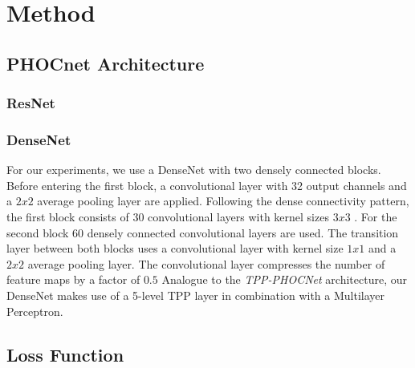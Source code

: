 \section{Method}\label{sec:method}


\subsection{PHOCnet Architecture}\label{sec:text_det}

 
\subsubsection{ResNet}\label{sec:text_det_sift}


\subsubsection{DenseNet}\label{sec:DenseNet}
For our experiments, we use a DenseNet with two densely connected blocks.
Before entering the first block, a convolutional layer with 32 output channels and a $2x2$ average pooling layer are applied.
Following the dense connectivity pattern, the first block consists of 30 convolutional layers with kernel sizes $3x3$ .
For the second block 60 densely connected convolutional layers are used.
The transition layer between both blocks uses a convolutional layer with kernel size $1x1$ and a $2x2$ average pooling layer.
The convolutional layer compresses the number of feature maps by a factor of $0.5$
Analogue to the \textit{TPP-PHOCNet} architecture, our DenseNet makes use of a 5-level TPP layer in combination with a Multilayer Perceptron.


\subsection{Loss Function}\label{sec:word_class}

